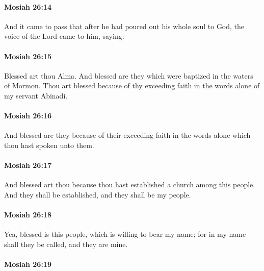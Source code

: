 		\paragraph{Mosiah 26:14} %
			\label{MOSIAH-26-14}

			And it came to pass that after he had poured out his whole soul to God,
			the voice of the Lord came to him, saying:

		\paragraph{Mosiah 26:15} %
			\label{MOSIAH-26-15}

			Blessed art thou Alma.
			And blessed are they which were baptized in the waters of Mormon.
			Thou art blessed because of thy exceeding faith
			in the words alone of my servant Abinadi.

		\paragraph{Mosiah 26:16} %
			\label{MOSIAH-26-16}

			And blessed are they because of their exceeding faith
			in the words alone which thou hast spoken unto them.

		\paragraph{Mosiah 26:17} %
			\label{MOSIAH-26-17}

			And blessed art thou because thou hast established a church among this people.
			And they shall be established, and they shall be my people.

		\paragraph{Mosiah 26:18} %
			\label{MOSIAH-26-18}

			Yea, blessed is this people, which is willing to bear my name;
			for in my name shall they be called, and they are mine.

		\paragraph{Mosiah 26:19} %
			\label{MOSIAH-26-19}

